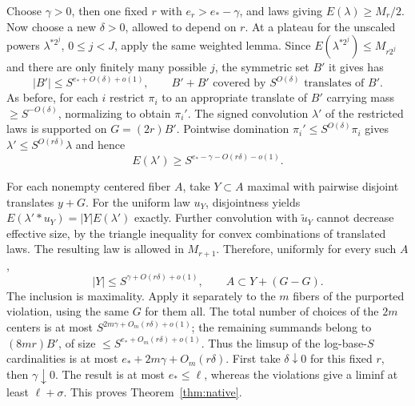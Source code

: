Choose $\gamma>0$, then one fixed $r$ with $e_r>e_*-\gamma$, and
laws giving $E(\lambda)\ge M_r/2$. Now choose a new $\delta>0$,
allowed to depend on $r$. At a plateau for the unscaled powers
$\lambda^{*2^j}$, $0\le j<J$, apply the same weighted lemma.
Since $E(\lambda^{*2^j})\le M_{r2^j}$ and there are only finitely
many possible $j$, the symmetric set $B'$ it gives has
\[
 |B'|\le S^{e_*+O(\delta)+o(1)},\qquad
 B'+B'\text{ covered by }S^{O(\delta)}\text{ translates of }B'.
\]
As before, for each $i$ restrict $\pi_i$ to an appropriate
translate of $B'$ carrying mass $\ge S^{-O(\delta)}$, normalizing
to obtain $\pi_i'$. The signed convolution $\lambda'$ of the
restricted laws is supported on $G=(2r)B'$. Pointwise domination
$\pi_i'\le S^{O(\delta)}\pi_i$ gives
$\lambda'\le S^{O(r\delta)}\lambda$ and hence
\[
 E(\lambda')\ge S^{e_*-\gamma-O(r\delta)-o(1)}.
\]

For each nonempty centered fiber $A$, take $Y\subset A$ maximal
with pairwise disjoint translates $y+G$. For the uniform law $u_Y$,
disjointness yields $E(\lambda'*u_Y)=|Y|E(\lambda')$ exactly.
Further convolution with $\widetilde u_Y$ cannot decrease effective
size, by the triangle inequality for convex combinations of translated
laws. The resulting law is allowed in $M_{r+1}$. Therefore, uniformly
for every such $A$,
\[
 |Y|\le S^{\gamma+O(r\delta)+o(1)},\qquad A\subset Y+(G-G).
\]
The inclusion is maximality. Apply it separately to the $m$ fibers of
the purported violation, using the same $G$ for them all. The total
number of choices of the $2m$ centers is at most
$S^{2m\gamma+O_m(r\delta)+o(1)}$; the remaining summands belong
to $(8mr)B'$, of size $\le S^{e_*+O_m(r\delta)+o(1)}$.
Thus the limsup of the log-base-$S$ cardinalities is at most
$e_*+2m\gamma+O_m(r\delta)$. First take $\delta\downarrow0$ for
this fixed $r$, then $\gamma\downarrow0$. The result is at most
$e_*\le\ell$, whereas the violations give a liminf at least
$\ell+\sigma$. This proves Theorem~\ref{thm:native}.
